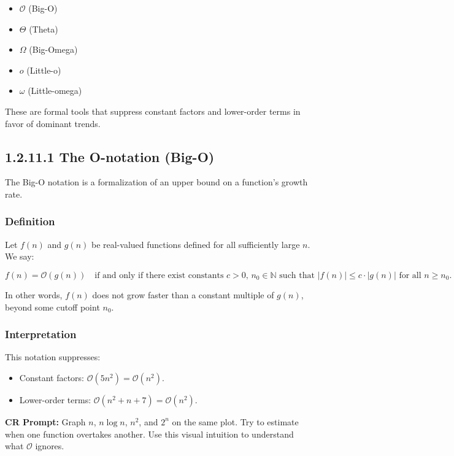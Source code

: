 \documentclass{article}
\begin{document}
\begin{itemize}
    \item $\mathcal{O}$ (Big-O)
    \item $\Theta$ (Theta)
    \item $\Omega$ (Big-Omega)
    \item $o$ (Little-o)
    \item $\omega$ (Little-omega)
\end{itemize}

These are formal tools that suppress constant factors and lower-order terms in favor of dominant trends.

\subsection*{1.2.11.1 The O-notation (Big-O)}

The Big-O notation is a formalization of an upper bound on a function's growth rate.

\subsubsection*{Definition}

Let $f(n)$ and $g(n)$ be real-valued functions defined for all sufficiently large $n$. We say:

\[
f(n) = \mathcal{O}(g(n)) \quad \text{if and only if there exist constants } c > 0,\, n_0 \in \mathbb{N} \text{ such that } |f(n)| \le c \cdot |g(n)| \text{ for all } n \ge n_0.
\]

In other words, $f(n)$ does not grow faster than a constant multiple of $g(n)$, beyond some cutoff point $n_0$.

\subsubsection*{Interpretation}

This notation suppresses:

\begin{itemize}
    \item Constant factors: $\mathcal{O}(5n^2) = \mathcal{O}(n^2)$.
    \item Lower-order terms: $\mathcal{O}(n^2 + n + 7) = \mathcal{O}(n^2)$.
\end{itemize}

\textbf{CR Prompt:} Graph $n$, $n \log n$, $n^2$, and $2^n$ on the same plot. Try to estimate when one function overtakes another. Use this visual intuition to understand what $\mathcal{O}$ ignores.
\end{document}
